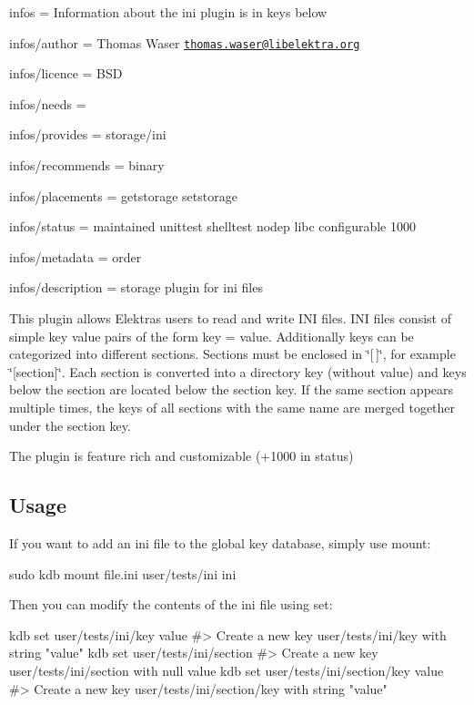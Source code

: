 
\begin{DoxyItemize}
\item infos = Information about the ini plugin is in keys below
\item infos/author = Thomas Waser \href{mailto:thomas.waser@libelektra.org}{\tt thomas.\+waser@libelektra.\+org}
\item infos/licence = B\+SD
\item infos/needs =
\item infos/provides = storage/ini
\item infos/recommends = binary
\item infos/placements = getstorage setstorage
\item infos/status = maintained unittest shelltest nodep libc configurable 1000
\item infos/metadata = order
\item infos/description = storage plugin for ini files
\end{DoxyItemize}

This plugin allows Elektra\textquotesingle{}s users to read and write I\+NI files. I\+NI files consist of simple key value pairs of the form {\ttfamily key = value}. Additionally keys can be categorized into different sections. Sections must be enclosed in \char`\"{}\mbox{[}$\,$\mbox{]}\char`\"{}, for example \char`\"{}\mbox{[}section\mbox{]}\char`\"{}. Each section is converted into a directory key (without value) and keys below the section are located below the section key. If the same section appears multiple times, the keys of all sections with the same name are merged together under the section key.

The plugin is feature rich and customizable (+1000 in status)

\subsection*{Usage}

If you want to add an ini file to the global key database, simply use mount\+:


\begin{DoxyCode}
sudo kdb mount file.ini user/tests/ini ini
\end{DoxyCode}


Then you can modify the contents of the ini file using set\+:


\begin{DoxyCode}
kdb set user/tests/ini/key value
#> Create a new key user/tests/ini/key with string "value"
kdb set user/tests/ini/section
#> Create a new key user/tests/ini/section with null value
kdb set user/tests/ini/section/key value
#> Create a new key user/tests/ini/section/key with string "value"
\end{DoxyCode}


